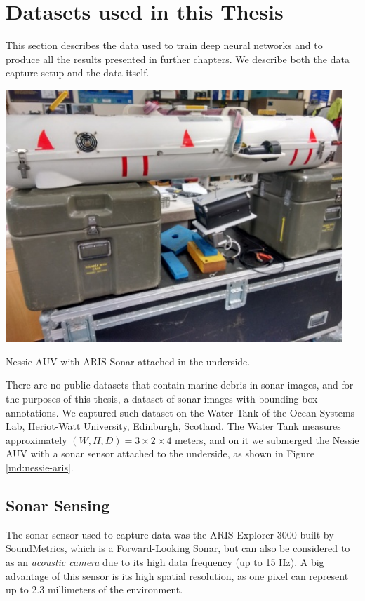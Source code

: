 \section{Datasets used in this Thesis}

This section describes the data used to train deep neural networks and to produce all the results presented in further chapters. We describe both the data capture setup and the data itself.

\begin{marginfigure}
    \centering
    \includegraphics[width = 0.95\textwidth]{chapters/images/dataset/nessie-aris.jpg}
    \caption{Nessie AUV with ARIS Sonar attached in the underside.}
    \label{md:nessie-aris}
\end{marginfigure}

There are no public datasets that contain marine debris in sonar images, and for the purposes of this thesis, a dataset of sonar images with bounding box annotations. We captured such dataset on the Water Tank of the Ocean Systems Lab, Heriot-Watt University, Edinburgh, Scotland. The Water Tank measures approximately $(W, H, D) = 3 \times 2 \times 4$ meters, and on it we submerged the Nessie AUV with a sonar sensor attached to the underside, as shown in Figure \ref{md:nessie-aris}.

\subsection{Sonar Sensing}

The sonar sensor used to capture data was the ARIS Explorer 3000\cite[-6em]{arisExplorer3K} built by SoundMetrics, which is a Forward-Looking Sonar, but can also be considered to as an \textit{acoustic camera} due to its high data frequency (up to 15 Hz). A big advantage of this sensor is its high spatial resolution, as one pixel can represent up to 2.3 millimeters of the environment.

